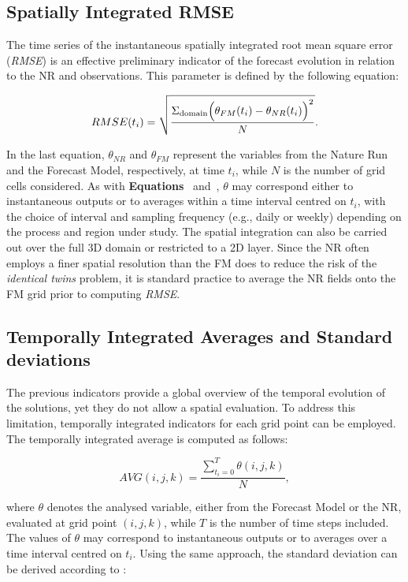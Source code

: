\subsection{Spatially Integrated RMSE}
The time series of the instantaneous spatially integrated root mean square error (\textit{RMSE}) is an effective preliminary indicator of the forecast evolution in relation to the NR and observations. This parameter is defined by the following equation:

\begin{equation}\label{eq:cp2_rmse}
	RMSE(t_i) = \sqrt{\frac{\Sigma_\text{domain} \Bigl( \theta_{FM}(t_i) - \theta_{NR}(t_i) \Bigr)^2}{N}}.
\end{equation}

In the last equation, $\theta_{NR}$ and $\theta_{FM}$ represent the variables from the Nature Run and the Forecast Model, respectively, at time $t_i$, while $N$ is the number of grid cells considered. As with \textbf{Equations}~ and~, $\theta$ may correspond either to instantaneous outputs or to averages within a time interval centred on $t_i$, with the choice of interval and sampling frequency (e.g., daily or weekly) depending on the process and region under study. The spatial integration can also be carried out over the full 3D domain or restricted to a 2D layer. Since the NR often employs a finer spatial resolution than the FM does to reduce the risk of the \textit{identical twins} problem, it is standard practice to average the NR fields onto the FM grid prior to computing \textit{RMSE}.

\subsection{Temporally Integrated Averages and Standard deviations}
The previous indicators provide a global overview of the temporal evolution of the solutions, yet they do not allow a spatial evaluation. To address this limitation, temporally integrated indicators for each grid point can be employed. The temporally integrated average is computed as follows:

\begin{equation}\label{eq:cp2_avgt}
    AVG(i,j,k) = \frac{\sum_{t_i=0}^{T}\theta(i,j,k)}{N},
\end{equation}

\noindent where $\theta$ denotes the analysed variable, either from the Forecast Model or the NR, evaluated at grid point $(i,j,k)$, while $T$ is the number of time steps included. The values of $\theta$ may correspond to instantaneous outputs or to averages over a time interval centred on $t_i$. Using the same approach, the standard deviation can be derived according to :


